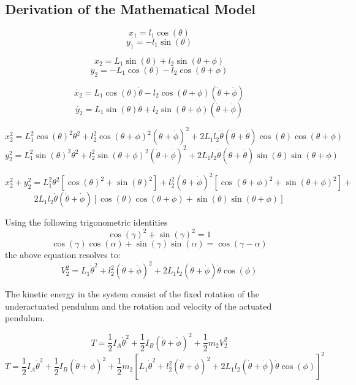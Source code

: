 \chapter{}
\label{chp2:concept_model}

\section{Derivation of the Mathematical Model}
\label{sec:math_model}

$$x_{1}= l_{1}\cos(\theta)$$
$$y_{1} = -l_{1}\sin(\theta)$$

$$x_{2} = L_{1}\sin(\theta) + l_{2}\sin(\theta + \phi)$$
$$y_{2} = -L_{1}\cos(\theta) - l_{2}\cos(\theta + \phi)$$

$$\dot{x_{2}} = L_{1}\cos(\theta)\dot{\theta} - l_{2}\cos(\theta+\phi)(\dot{\theta}+\dot{\phi}) $$
$$\dot{y_{2}} = L_{1}\sin(\theta)\dot{\theta}+l_{2}\sin(\theta+\phi)(\dot{\theta}+\dot{\phi})$$

$$x_{2}^2 = L_{1}^2\cos(\theta)^2\theta^2 +l_{2}^2\cos(\theta+\phi)^2(\dot{\theta}+\dot{\phi})^2 + 2L_{1}l_{2}\dot{\theta}(\dot{\theta}+\dot{\theta})\cos(\theta)\cos(\theta+\phi)$$
$$y_{2}^2 = L_{1}^2\sin(\theta)^2\theta^2 +l_{2}^2\sin(\theta+\phi)^2(\dot{\theta}+\dot{\phi})^2 + 2L_{1}l_{2}\dot{\theta}(\dot{\theta}+\dot{\theta})\sin(\theta)\sin(\theta+\phi)$$

$$x_{2}^2+y_{2}^2 = L_{1}^2\theta^2[\cos(\theta)^2+\sin(\theta)^2]+l_{2}^2(\dot{\theta}+\dot{\phi})^2[\cos(\theta+\phi)^2+\sin(\theta+\phi)^2] +$$
$$ 2L_{1}l_{2}\dot{\theta}(\dot{\theta}+\dot{\phi})[\cos(\theta)\cos(\theta+\phi)+\sin(\theta)\sin(\theta+\phi)]$$	

Using the following trigonometric identities $$ \cos(\gamma)^2 + \sin(\gamma)^2 = 1 $$ 
$$ \cos(\gamma)\cos(\alpha)+\sin(\gamma)\sin(\alpha) = \cos(\gamma - \alpha) $$ the above equation resolves to: $$ V_{2}^2 = L_{1}\dot{\theta}^2+l_{2}^2(\dot{\theta}+\dot{\phi})^2 + 
2L_{1}l_{2}(\dot{\theta}+\dot{\phi})\dot{\theta}\cos(\phi)$$

The kinetic energy in the system consist of the fixed rotation of the underactuated  pendulum and the rotation and velocity of the actuated pendulum.

$$ T = \frac{1}{2}I_{A}\dot{\theta}^2 + \frac{1}{2}I_{B}(\dot{\theta}+\dot{\phi})^2 + \frac{1}{2}m_{2}V_{2}^2$$
$$ T = \frac{1}{2}I_{A}\dot{\theta}^2 + \frac{1}{2}I_{B}(\dot{\theta}+\dot{\phi})^2 + \frac{1}{2}m_{2}[L_{1}\dot{\theta}^2+l_{2}^2(\dot{\theta}+\dot{\phi})^2 + 
2L_{1}l_{2}(\dot{\theta}+\dot{\phi})\dot{\theta}\cos(\phi)]^2$$

